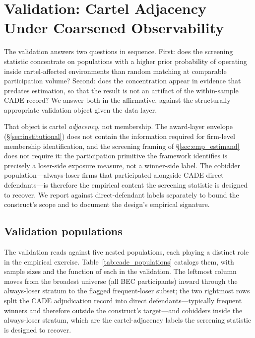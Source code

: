 \section{Validation: Cartel Adjacency Under Coarsened Observability}
\label{sec:cade}

The validation answers two questions in sequence. First: does
the screening statistic concentrate on populations with a higher
prior probability of operating inside cartel-affected
environments than random matching at comparable participation
volume? Second: does the concentration appear in evidence that
predates estimation, so that the result is not an artifact of
the within-sample CADE record? We answer both in the
affirmative, against the structurally appropriate validation
object given the data layer.

That object is cartel \emph{adjacency}, not membership. The
award-layer envelope (§\ref{sec:institutional}) does not contain
the information required for firm-level membership
identification, and the screening framing of
§\ref{sec:emp_estimand} does not require it: the participation
primitive the framework identifies is precisely a loser-side
exposure measure, not a winner-side label. The cobidder
population---always-loser firms that participated alongside CADE
direct defendants---is therefore the empirical content the
screening statistic is designed to recover. We report against
direct-defendant labels separately to bound the construct's
scope and to document the design's empirical signature.

\subsection{Validation populations}
\label{sec:cade_objects}

The validation reads against five nested populations, each playing
a distinct role in the empirical exercise.
Table~\ref{tab:cade_populations} catalogs them, with sample sizes
and the function of each in the validation. The leftmost column
moves from the broadest universe (all BEC participants) inward
through the always-loser stratum to the flagged frequent-loser
subset; the two rightmost rows split the CADE adjudication
record into direct defendants---typically frequent winners and
therefore outside the construct's target---and cobidders inside
the always-loser stratum, which are the cartel-adjacency labels
the screening statistic is designed to recover.

